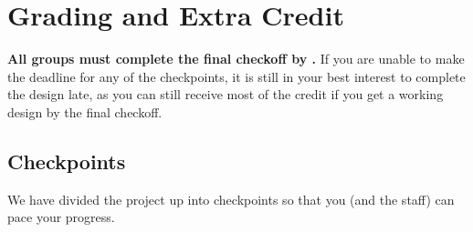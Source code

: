 \documentclass[11pt]{article}
\begin{document}
%
%
%
%
%

\pagebreak

\section{Grading and Extra Credit}
\textbf{All groups must complete the final checkoff by \finalCheckoffDueDate.}
If you are unable to make the deadline for any of the checkpoints, it is still in your best interest to complete the design late, as you can still receive most of the credit if you get a working design by the final checkoff.

\subsection{Checkpoints}
\label{checkoff}
We have divided the project up into checkpoints so that you (and the staff) can pace your progress.
\end{document}
